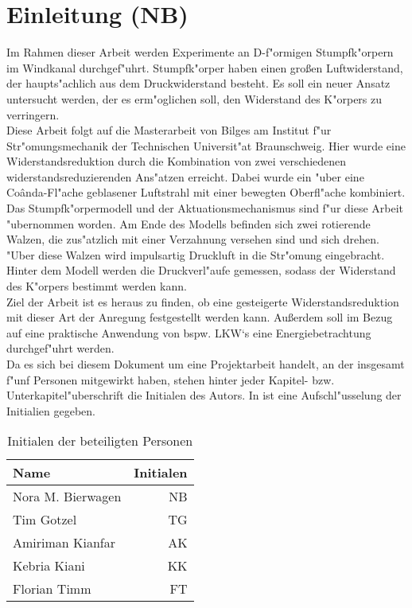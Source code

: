 \chapter{Einleitung (NB)}\label{s:einleitung}
Im Rahmen dieser Arbeit werden Experimente an D-f"ormigen Stumpfk"orpern im Windkanal durchgef"uhrt. Stumpfk"orper haben einen gro\ss{}en Luftwiderstand, der haupts"achlich aus dem Druckwiderstand besteht. Es soll ein neuer Ansatz untersucht werden, der es erm"oglichen soll, den Widerstand des K"orpers zu verringern.\\
Diese Arbeit folgt auf die Masterarbeit \cite{Bilges.2018} von Bilges am Institut f"ur Str"omungsmechanik der Technischen Universit"at Braunschweig. Hier wurde eine Widerstandsreduktion durch die Kombination von zwei verschiedenen widerstandsreduzierenden Ans"atzen erreicht. Dabei wurde ein "uber eine Co\^{a}nda-Fl"ache geblasener Luftstrahl mit einer bewegten Oberfl"ache kombiniert. Das Stumpfk"orpermodell und der Aktuationsmechanismus sind f"ur diese Arbeit "ubernommen worden. Am Ende des Modells befinden sich zwei rotierende Walzen, die zus"atzlich mit einer Verzahnung versehen sind und sich drehen. "Uber diese Walzen wird impulsartig Druckluft in die Str"omung eingebracht. Hinter dem Modell werden die Druckverl"aufe gemessen, sodass der Widerstand des K"orpers bestimmt werden kann.\\
Ziel der Arbeit ist es heraus zu finden, ob eine gesteigerte Widerstandsreduktion mit dieser Art der Anregung festgestellt werden kann. Au\ss{}erdem soll im Bezug auf eine praktische Anwendung von bspw. LKW`s eine Energiebetrachtung durchgef"uhrt werden.\\
Da es sich bei diesem Dokument um eine Projektarbeit handelt, an der insgesamt f"unf Personen mitgewirkt haben, stehen hinter jeder Kapitel- bzw. Unterkapitel"uberschrift die Initialen des Autors. In  ist eine Aufschl"usselung der Initialien gegeben.

\begin{table}[h]
	\centering
	\begin{tabular}{lr}
		\toprule
		Name & Initialen\\
		\midrule
		Nora M. Bierwagen & NB\\
		Tim Gotzel & TG\\
		Amiriman Kianfar & AK\\
		Kebria Kiani & KK\\
		Florian Timm & FT\\
		\bottomrule
	\end{tabular}
	\caption{Initialen der beteiligten Personen}
	\label{tab:initialien}
\end{table}
